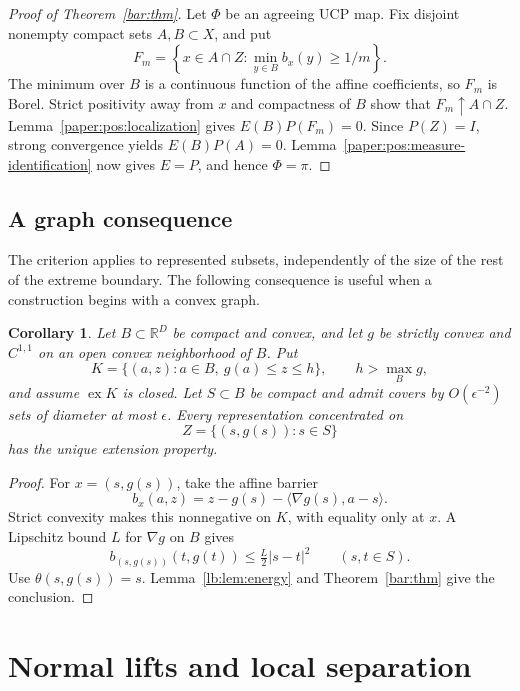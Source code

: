 \documentclass[11pt,letterpaper]{amsart}
\newtheorem{corollary}[theorem]{Corollary}
\theoremstyle{definition}
\theoremstyle{remark}
\numberwithin{equation}{section}
\DeclareMathOperator{\ex}{ex}
\begin{document}
\begin{proof}[Proof of Theorem~\ref{bar:thm}]
Let $\Phi$ be an agreeing UCP map. Fix disjoint nonempty
compact sets $A,B\subset X$, and put
\[
 F_m=\left\{x\in A\cap Z:
                    \min_{y\in B}b_x(y)\ge1/m\right\}.
\]
The minimum over $B$ is a continuous function of the affine
coefficients, so $F_m$ is Borel. Strict positivity away from
$x$ and compactness of $B$ show that $F_m\uparrow A\cap Z$.
Lemma~\ref{paper:pos:localization} gives $E(B)P(F_m)=0$.
Since $P(Z)=I$, strong convergence yields $E(B)P(A)=0$.
Lemma~\ref{paper:pos:measure-identification} now gives
$E=P$, and hence $\Phi=\pi$.
\end{proof}

\subsection{A graph consequence}

The criterion applies to represented subsets, independently of
the size of the rest of the extreme boundary. The following
consequence is useful when a construction begins with a
convex graph.

\begin{corollary}\label{cap:cor:graph}
Let $B\subset\mathbb R^D$ be compact and convex, and let $g$
be strictly convex and $C^{1,1}$ on an open convex neighborhood
of $B$. Put
\[
 K=\{(a,z):a\in B,\ g(a)\le z\le h\},
 \qquad h>\max_B g,
\]
and assume $\ex K$ is closed. Let $S\subset B$ be compact
and admit covers by $O(\epsilon^{-2})$ sets of diameter at
most $\epsilon$. Every representation concentrated on
\[
                 Z=\{(s,g(s)):s\in S\}
\]
has the unique extension property.
\end{corollary}
\begin{proof}
For $x=(s,g(s))$, take the affine barrier
\[
 b_x(a,z)=z-g(s)-\langle\nabla g(s),a-s\rangle.
\]
Strict convexity makes this nonnegative on $K$, with equality
only at $x$. A Lipschitz bound $L$ for $\nabla g$ on $B$
gives
\[
 b_{(s,g(s))}(t,g(t))\le\tfrac L2|s-t|^2
 \qquad(s,t\in S).
\]
Use $\theta(s,g(s))=s$. Lemma~\ref{lb:lem:energy} and
Theorem~\ref{bar:thm} give the conclusion.
\end{proof}

\section{Normal lifts and local separation}
\label{paper:pos:normal-lifts}
\end{document}
